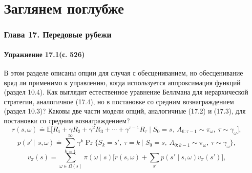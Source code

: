 \part{Заглянем поглубже}
\section{Глава 17. Передовые рубежи}
\subsection{Упражнение 17.1(с. 526)}
В этом разделе описаны опции для случая с обесцениванием, но обесценивание вряд
ли применимо к управлению, когда используется аппроксимация функций
(раздел 10.4). Как выглядит естественное уравнение Беллмана для иерархической
стратегии, аналогичное (17.4), но в постановке со средним вознаграждением
(раздел 10.3)? Каковы две части модели опций, аналогичные (17.2) и (17.3), для
постановки со средним вознаграждением?
\begin{equation}
    r(s,\omega) \doteq \mathbb E\big[R_1+\gamma R_2+\gamma^2 R_3+\cdots+\gamma^{\tau-1}R_\tau
    \mid S_0=s,\ A_{0:\tau-1}\sim\pi_\omega,\ \tau\sim\gamma_\omega\big],
    \tag{17.2}
\end{equation}
\begin{equation}
    p(s'\mid s,\omega) \doteq \sum_{k=1}^{\infty}\gamma^k
    \Pr\{S_k=s',\ \tau=k\mid S_0=s,\ A_{0:k-1}\sim\pi_\omega,\ \tau\sim\gamma_\omega\},
    \tag{17.3}
\end{equation}
\begin{equation}
    v_\pi(s) = \sum_{\omega\in\Omega(s)}\pi(\omega\mid s)
    \Big[r(s,\omega)+\sum_{s'}p(s'\mid s,\omega)v_\pi(s')\Big],
    \tag{17.4}
\end{equation}
